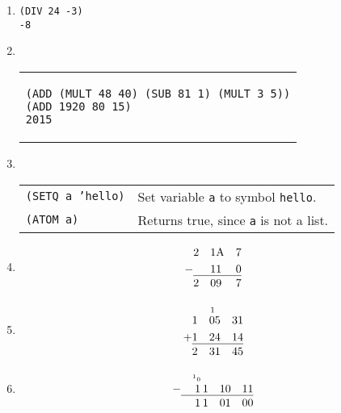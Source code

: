 \documentclass[12pt,letterpaper]{article}
\begin{document}
\begin{enumerate}

\item
\begin{verbatim}
(DIV 24 -3)
-8
\end{verbatim}

\item ~ %
  \\ \begin{tabular}{p{5in}}
\begin{verbatim}
(ADD (MULT 48 40) (SUB 81 1) (MULT 3 5))
(ADD 1920 80 15)
2015
\end{verbatim}
\end{tabular}

\item ~ %
  \\ \begin{tabular}{l l}
\texttt{(SETQ a 'hello)} & Set variable \texttt{a} to symbol \texttt{hello}. \\
\texttt{(ATOM a)}        & Returns true, since \texttt{a} is not a list.
\end{tabular}

\item \begin{alignat*}{5}
  & 2 & 1 & \text{A} & 7 \\
  - & & 1 & 1 & 0 \\[-1.2em]
  \cline{2-5} \\[-2em]
  & 2 & 0 & 9 & 7
\end{alignat*}

\item \begin{alignat*}{6}
  & & \text{\scriptsize 1} & & & \\[-0.5em]
  & 1 & 0 & 5 & 3 & 1 \\
  + & 1 & 2 & 4 & 1 & 4 \\[-1.2em]
  \cline{2-6} \\[-2em]
  & 2 & 3 & 1 & 4 & 5
\end{alignat*}

\item \begin{alignat*}{8}
  & & \text{\tiny \textsuperscript{1}0} & & & & & \\[-0.5em]
  - & & 1 & \hspace{2pt} 1 & 1 & 0 & 1 & 1 \\[-1.2em]
  \cline{2-8} \\[-2em]
  & & 1 & \hspace{2pt} 1 & 0 & 1 & 0 & 0
\end{alignat*}


\end{enumerate}
\end{document}
